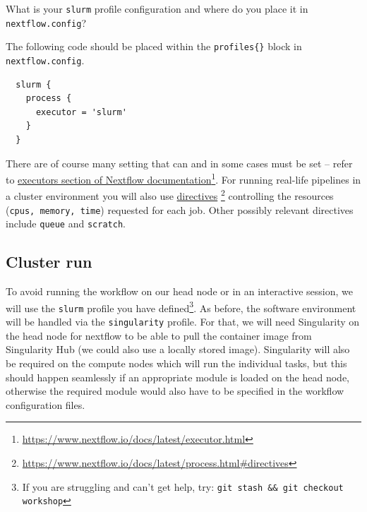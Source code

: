 \begin{questions}
What is your \texttt{slurm} profile configuration and where do you place it in \texttt{nextflow.config}?
\begin{answer}
The following code should be placed within the \texttt{profiles\{\}} block in \texttt{nextflow.config}.
\begin{lstlisting}
  slurm {
    process {
      executor = 'slurm'
    }
  }
\end{lstlisting}
\end{answer}
\end{questions}



There are of course many setting that can and in some cases must be set -- refer to 
\href{https://www.nextflow.io/docs/latest/executor.html}{executors section of Nextflow documentation}\footnote{\url{https://www.nextflow.io/docs/latest/executor.html}}. 
For running real-life pipelines in a cluster environment you will also use 
\href{https://www.nextflow.io/docs/latest/process.html#directives}{directives} \footnote{\url{https://www.nextflow.io/docs/latest/process.html\#directives}}
controlling the resources (\texttt{cpus, memory, time}) requested for each job. Other possibly relevant directives include \texttt{queue} and \texttt{scratch}.



\subsection{Cluster run}


To avoid running the workflow on our head node or in an interactive session, we will use the \texttt{slurm} profile you have defined\footnote{If you are struggling and can't get help, try: \texttt{git stash \&\& git checkout workshop}}. 
As before, the software environment will be handled via the \texttt{singularity} profile. 
For that, we will need Singularity on the head node for nextflow to be able to pull the container image from Singularity Hub (we could also use a locally stored image). Singularity will also be required on the compute nodes which will run the individual tasks, but this should happen seamlessly if an appropriate module is loaded on the head node, otherwise the required module would also have to be specified in the workflow configuration files. 

